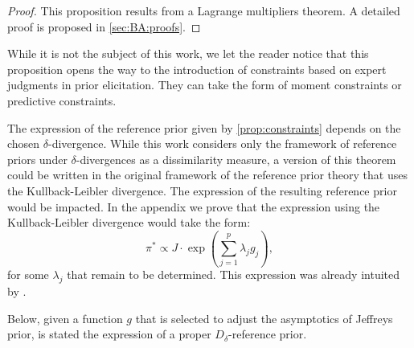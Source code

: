\begin{proof}
    This proposition results from a Lagrange multipliers theorem. A detailed proof is proposed in \cref{sec:BA:proofs}.
\end{proof}



\begin{rem}
    While it is not the subject of this work, we let the reader notice that this proposition opens the way to the introduction of constraints based on expert judgments in prior elicitation. They can take the form of moment constraints or predictive constraints. %
\end{rem}

\begin{rem}\label{rem:klconst}
    The expression of the reference prior given by \cref{prop:constraints} depends on the chosen $\delta$-divergence.
    While this work considers only the framework of reference priors under $\delta$-divergences as a dissimilarity measure, a version of this theorem could be written in the original framework of the reference prior theory that uses the Kullback-Leibler divergence. The expression of the resulting reference prior would be impacted. 
    In the appendix we prove that the expression using the Kullback-Leibler divergence would take the form:
        \begin{equation}
            \pi^\ast\propto J\cdot\exp\left(\sum_{j=1}^p\lambda_j g_j\right),
        \end{equation}
        for some $\lambda_j$ that remain to be determined.
    This expression was already intuited by \citet{bernardo_bayesian_1994}.
\end{rem}
 



Below, given a function $g$ that is selected to adjust the asymptotics of Jeffreys prior, is stated the expression of a proper $D_\delta$-reference prior.

